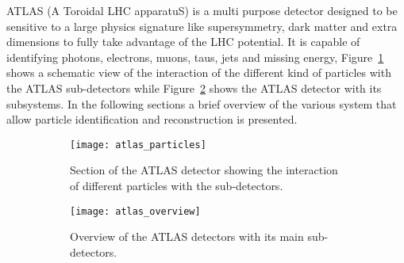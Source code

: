 ATLAS (A Toroidal LHC apparatuS) is a multi purpose detector designed to be
sensitive to a large physics signature like supersymmetry, dark matter and extra
dimensions to fully take advantage of the LHC potential. It is capable of
identifying photons, electrons, muons, taus, jets and missing energy,
Figure~\ref{fig:atlas_particles} shows a schematic view of the interaction of
the different kind of particles with the ATLAS sub-detectors while
Figure~\ref{fig:atlas_overview} shows the ATLAS detector with its subsystems. In
the following sections a brief overview of the various system that allow
particle identification and reconstruction is presented.

\begin{figure}[!h]
  \centering
  \begin{subfigure}[t]{.48\linewidth}
    \texttt{[image: atlas\_particles]}
    \caption{Section of the ATLAS detector showing the interaction of different
      particles with the sub-detectors.}
    \label{fig:atlas_particles}
  \end{subfigure} \quad
  \begin{subfigure}[t]{.48\linewidth}
    \texttt{[image: atlas\_overview]}
    \caption{Overview of the ATLAS detectors with its main sub-detectors.}
    \label{fig:atlas_overview}
  \end{subfigure}
  \caption{}
  \label{fig:atlas}
\end{figure}
